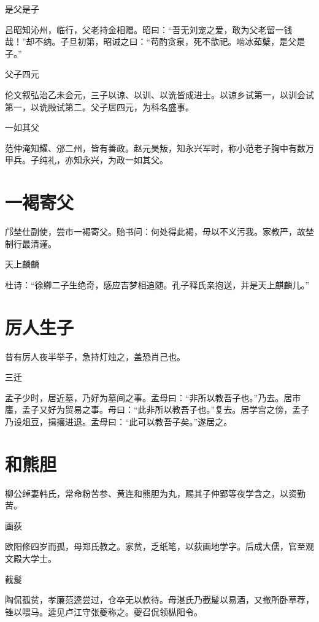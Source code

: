 \documentclass[a4paper,12pt,UTF8,twoside]{ctexbook}
\begin{document}
    是父是子
    
    吕昭知沁州，临行，父老持金相赠。昭曰：“吾无刘宠之爱，敢为父老留一钱哉！”却不纳。子旦初第，昭诫之曰：“苟酌贪泉，死不歆祀。啮冰茹櫱，是父是子。”
    
    父子四元
    
    伦文叙弘治乙未会元，三子以谅、以训、以诜皆成进士。以谅乡试第一，以训会试第一，以诜殿试第二。父子居四元，为科名盛事。
    
    一如其父
    
    范仲淹知耀、邠二州，皆有善政。赵元昊叛，知永兴军时，称小范老子胸中有数万甲兵。子纯礼，亦知永兴，为政一如其父。
    
    \section{一褐寄父}
    
    邝埜仕副使，尝市一褐寄父。贻书问：何处得此褐，毋以不义污我。家教严，故埜制行最清谨。
    
    天上麟麟
    
    杜诗：“徐卿二子生绝奇，感应吉梦相追随。孔子释氏亲抱送，并是天上麒麟儿。”
    
    \section{厉人生子}
    
    昔有厉人夜半举子，急持灯烛之，盖恐肖己也。
    
    三迁
    
    孟子少时，居近墓，乃好为墓间之事。孟母曰：“非所以教吾子也。”乃去。居市廛，孟子又好为贸易之事。母曰：“此非所以教吾子也。”复去。居学宫之傍，孟子乃设俎豆，揖攘进退。孟母曰：“此可以教吾子矣。”遂居之。
    
    \section{和熊胆}
    
    柳公绰妻韩氏，常命粉苦参、黄连和熊胆为丸，赐其子仲郢等夜学含之，以资勤苦。
    
    画荻
    
    欧阳修四岁而孤，母郑氏教之。家贫，乏纸笔，以荻画地学字。后成大儒，官至观文殿大学士。
    
    截髲
    
    陶侃孤贫，孝廉范逵尝过，仓卒无以款待。母湛氏乃截髲以易酒，又撤所卧草荐，锉以喂马。逵见卢江守张夔称之。夔召侃领枞阳令。
    
\end{document}
